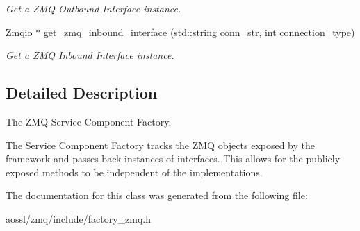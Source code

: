 \begin{DoxyCompactItemize}
\begin{DoxyCompactList}\small\item\em Get a Z\+MQ Outbound Interface instance. \end{DoxyCompactList}\item 
\hyperlink{classZmqio}{Zmqio} $\ast$ \hyperlink{classZmqComponentFactory_a37c5e3dd16c61ac581dcf6ed94525f22}{get\+\_\+zmq\+\_\+inbound\+\_\+interface} (std\+::string conn\+\_\+str, int connection\+\_\+type)\hypertarget{classZmqComponentFactory_a37c5e3dd16c61ac581dcf6ed94525f22}{}\label{classZmqComponentFactory_a37c5e3dd16c61ac581dcf6ed94525f22}

\begin{DoxyCompactList}\small\item\em Get a Z\+MQ Inbound Interface instance. \end{DoxyCompactList}\end{DoxyCompactItemize}


\subsection{Detailed Description}
The Z\+MQ Service Component Factory. 

The Service Component Factory tracks the Z\+MQ objects exposed by the framework and passes back instances of interfaces. This allows for the publicly exposed methods to be independent of the implementations. 

The documentation for this class was generated from the following file\+:\begin{DoxyCompactItemize}
\item 
aossl/zmq/include/factory\+\_\+zmq.\+h\end{DoxyCompactItemize}
